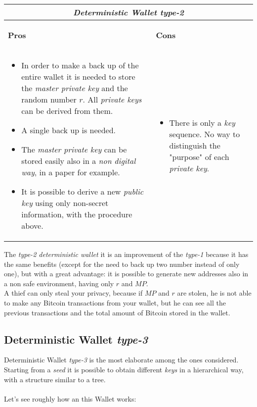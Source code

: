 \begin{center}
	\begin{tabular}{ |p{6cm}|p{6cm}|  }
		\hline
		\multicolumn{2}{|c|}{\textbf{\textit{Deterministic Wallet type-2}}} \\
		\hline \hline 
		\begin{center}
			\textbf{Pros}
		\end{center}&\begin{center}
			\textbf{Cons}
		\end{center}\\
		\hline
		\begin{itemize}
			\item In order to make a back up of the entire wallet it is needed to store the \textit{master private key} and the random number $r$. All \textit{private keys} can be derived from them.
			\item A single back up is needed.
			\item The \textit{master private key} can be stored easily also in a \textit{non digital way}, in a paper for example.
			\item It is possible to derive a new \textit{public key} using only non-secret information, with the procedure above.
		\end{itemize} &
		\begin{itemize}
			\item There is only a \textit{key} sequence. No way to distinguish the "purpose" of each \textit{private key}.
		\end{itemize}\\
		\hline
	\end{tabular}
\end{center}
The \textit{type-2 deterministic wallet} it is an improvement of the \textit{type-1} because it has the same benefits (except for the need to back up two number instead of only one), but with a great advantage: it is possible to generate new addresses also in a non safe environment, having only $r$ and $MP$. \\
A thief can only steal your privacy, because if $MP$ and $r$ are stolen, he is not able to make any Bitcoin transactions from your wallet, but he can see all the previous transactions and the total amount of Bitcoin stored in the wallet.

\subsection{Deterministic Wallet \textit{type-3}}
Deterministic Wallet \textit{type-3} is the most elaborate among the ones considered. Starting from a \textit{seed} it is possible to obtain different \textit{keys} in a hierarchical way, with a structure similar to a tree. \\ \\
Let's see roughly how an this Wallet works:

